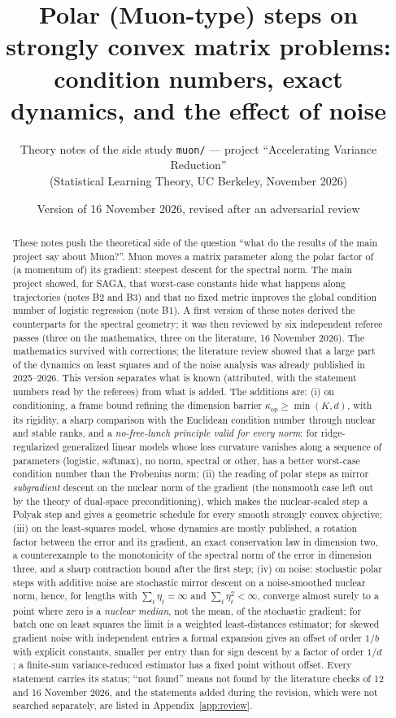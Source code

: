 \documentclass[11pt]{article}
\title{Polar (Muon-type) steps on strongly convex matrix problems:\\ condition numbers, exact dynamics, and the effect of noise}
\author{Theory notes of the side study \texttt{muon/} --- project ``Accelerating Variance Reduction''\\ (Statistical Learning Theory, UC Berkeley, November 2026)}
\date{Version of 16 November 2026, revised after an adversarial review}
\theoremstyle{definition}
\theoremstyle{remark}
\newcommand{\kop}{\kappa_{\mathrm{op}}}
\begin{document}
\maketitle

\begin{abstract}
These notes push the theoretical side of the question ``what do the results of the main project say about Muon?''.
Muon moves a matrix parameter along the polar factor of (a momentum of) its gradient: steepest descent for the spectral
norm. The main project showed, for SAGA, that worst-case constants hide what happens along trajectories (notes B2 and
B3) and that no fixed metric improves the global condition number of logistic regression (note B1). A first version of
these notes derived the counterparts for the spectral geometry; it was then reviewed by six independent referee passes
(three on the mathematics, three on the literature, 16 November 2026). The mathematics survived with corrections;
the literature review showed that a large part of the dynamics on least squares and of the noise analysis was already
published in 2025--2026. This version separates what is known (attributed, with the statement numbers read by the
referees) from what is added. The additions are: (i) on conditioning, a frame bound refining the dimension barrier
$\kop\ge\min(K,d)$, with its rigidity, a sharp comparison with the Euclidean condition number through nuclear and stable
ranks, and a \emph{no-free-lunch principle valid for every norm}: for ridge-regularized generalized linear models whose
loss curvature vanishes along a sequence of parameters (logistic, softmax), no norm, spectral or other, has a better
worst-case condition number than the Frobenius norm; (ii) the reading of polar
steps as mirror \emph{subgradient} descent on the nuclear norm of the gradient (the nonsmooth case left out by the
theory of dual-space preconditioning), which makes the nuclear-scaled step a Polyak step and gives a geometric schedule
for every smooth strongly convex objective; (iii) on the least-squares model, whose dynamics are mostly published, a
rotation factor between the error and its gradient, an exact conservation law in dimension two, a counterexample to
the monotonicity of the spectral norm of the error in dimension three, and a sharp contraction bound after the first
step; (iv) on noise: stochastic polar steps with additive noise are stochastic mirror descent on a noise-smoothed
nuclear norm, hence, for lengths with $\sum_t\eta_t=\infty$ and $\sum_t\eta_t^2<\infty$, converge almost surely to a
point where zero is a \emph{nuclear median}, not the mean, of the stochastic gradient; for batch one on least squares
the limit is a weighted least-distances estimator; for skewed gradient noise with independent entries a formal
expansion gives an offset of order $1/b$ with explicit constants, smaller per entry than for sign descent by a
factor of order $1/d$; a finite-sum variance-reduced estimator has a fixed point without offset. Every statement
carries its status; ``not found'' means not found by the literature checks of 12 and 16 November 2026, and the
statements added during the revision, which were not searched separately, are listed in Appendix~\ref{app:review}.
\end{abstract}
\end{document}
